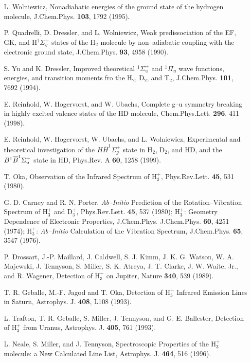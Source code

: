 \begin{thebibliography}{999}
L. Wolniewicz,
Nonadiabatic energies of the ground state of the hydrogen
molecule,
J.Chem.Phys. {\bf 103}, 1792 (1995).



P. Quadrelli, D. Dressler, and L. Wolniewicz,
Weak predissociation of the EF, GK, and H$^1\Sigma^+_g$ states
of the H$_2$ molecule by non--adiabatic coupling
with the electronic ground state,
J.Chem.Phys. {\bf 93}, 4958 (1990).


S. Yu and K. Dressler, 
Improved theoretical $^1\Sigma_u^+$ and $^1\Pi_u$ wave functions,
energies, and transition moments fro the H$_2$, D$_2$, and T$_2$,
J.Chem.Phys. {\bf 101}, 7692 (1994).

E. Reinhold, W. Hogervorst, and W. Ubachs,
Complete g--u symmetry breaking in highly excited valence states
of the HD molecule,
Chem.Phys.Lett. {\bf 296}, 411 (1998).

E. Reinhold, W. Hogervorst, W. Ubachs, and L. Wolniewicz,
Experimental and theoretical investigation of the 
$H\overline{H}^1\Sigma_g^+$ state in H$_2$, D$_2$, and HD,
and the $B"\overline{B}^1\Sigma_u^+$ state in HD,
Phys.Rev. A {\bf 60}, 1258 (1999).


T. Oka, 
Observation of the Infrared Spectrum of H$_3^+$, 
Phys.Rev.Lett. {\bf 45}, 531 (1980).

G. D. Carney and R. N. Porter, 
{\it Ab--Initio} Prediction of the Rotation--Vibration 
Spectrum of H$_3^+$ and D$_3^+$,
Phys.Rev.Lett. {\bf 45}, 537 (1980);
H$_3^+$: Geometry Dependence of Electronic Properties, J.Chem.Phys. 
J.Chem.Phys. {\bf 60}, 4251 (1974);
H$_3^+$: {\it Ab--Initio} Calculation of the Vibration Spectrum,
J.Chem.Phys. {\bf 65}, 3547 (1976).

P. Drossart, J.-P. Maillard, J. Caldwell, S. J. Kimm,
J. K. G. Watson, W. A. Majewski, J. Tennyson, S. Miller, S. K. Atreya,
J. T. Clarke, J. W. Waite, Jr., and R. Wagener, 
Detection of H$_3^+$ on Jupiter,
Nature {\bf 340},
539 (1989).

T. R. Geballe, M.-F. Jagod and T. Oka, 
Detection of H$_3^+$ Infrared Emission Lines
in Saturn,
Astrophys. J. {\bf 408},
L108 (1993).

L. Trafton, T. R. Geballe, S. Miller, J. Tennyson, and
G. E. Ballester, 
Detection of H$_3^+$ from Uranus,
Astrophys. J. {\bf 405}, 761 (1993).

L. Neale, S. Miller, and J. Tennyson, 
Spectroscopic Properties of the H$_3^+$ molecule:
a New Calculated Line List,
Astrophys. J. {\bf 464}, 516
(1996).


\end{thebibliography}
